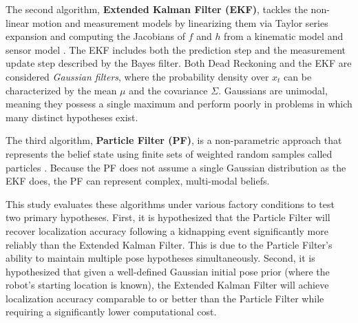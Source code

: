 The second algorithm, \textbf{Extended Kalman Filter (EKF)}, tackles the non-linear motion and measurement models by linearizing them via Taylor series expansion and computing the Jacobians of $f$ and $h$ from a kinematic model and sensor model \cite{thrun2005probabilistic}.
The EKF includes both the prediction step and the measurement update step described by the Bayes filter.
Both Dead Reckoning and the EKF are considered \textit{Gaussian filters}, where the probability density over $x_t$ can be characterized by the mean $\mu$ and the covariance $\Sigma$.
Gaussians are unimodal, meaning they possess a single maximum and perform poorly in problems in which many distinct hypotheses exist.

The third algorithm, \textbf{Particle Filter (PF)}, is a non-parametric approach that represents the belief state using finite sets of weighted random samples called particles \cite{doucet2000sequential}.
Because the PF does not assume a single Gaussian distribution as the EKF does, the PF can represent complex, multi-modal beliefs.

This study evaluates these algorithms under various factory conditions to test two primary hypotheses. First, it is hypothesized that the Particle Filter will recover localization accuracy following a kidnapping event significantly more reliably than the Extended Kalman Filter. 
This is due to the Particle Filter's ability to maintain multiple pose hypotheses simultaneously. 
Second, it is hypothesized that given a well-defined Gaussian initial pose prior (where the robot's starting location is known), the Extended Kalman Filter will achieve localization accuracy comparable to or better than the Particle Filter while requiring a significantly lower computational cost.